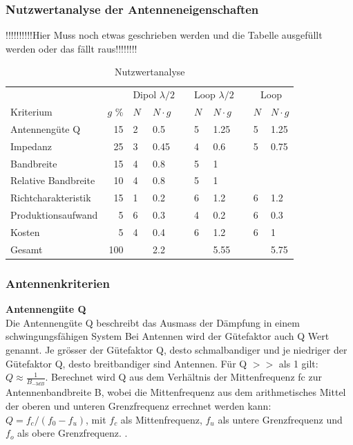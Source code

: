 \subsubsection{Nutzwertanalyse der Antenneneigenschaften }
!!!!!!!!!!Hier Muss noch etwas geschrieben werden und die Tabelle ausgefüllt werden oder das fällt raus!!!!!!!!
\begin{table}[!ht]
 \centering
 \begin{tabular}{l r l l l l l l l l} \toprule 
 && \multicolumn{2}{c}{Dipol $\lambda/2$} && \multicolumn{2}{c}{Loop $\lambda/2$} && \multicolumn{2}{c}{Loop} \\ \cmidrule{3-4} \cmidrule{6-7} \cmidrule{9-10}
 	Kriterium 	& $g$ \% 		& $N$ & $N\cdot g$ 	&& $N$ & $N\cdot g$ 		&& $N$ 	& $N\cdot g$ \\ \midrule
 	Antennengüte Q 	& 15 	& 2 & 0.5 	&& 5 & 1.25 && 5 	& 1.25 \\
 	Impedanz 	& 25 	& 3 & 0.45 	&& 4 & 0.6 && 5 	& 0.75 \\
	Bandbreite 				&	15			& 4 	& 0.8 	&& 5 & 1 							&&		&	\\
	Relative Bandbreite 		&	10			& 4 	& 0.8 	&& 5 & 1 							&&		&	\\
 	Richtcharakteristik & 15 & 1 & 0.2 	&& 6 & 1.2 && 6 	& 1.2 \\
 	Produktionsaufwand 	& 5 & 6 & 0.3 	&& 4 & 0.2 && 6 	& 0.3 \\
 	Kosten & 5 	& 4 & 0.4 	&& 6 & 1.2 && 6 	& 1 \\
 \hline
 Gesamt & 100 	& & 2.2 	&& & 5.55 && 	& 5.75 \\ \bottomrule
 \end{tabular}
 \caption{Nutzwertanalyse }
 \label{nutzwertEvaluation}
\end{table}


\subsubsection{Antennenkriterien}
\textbf{Antennengüte Q}\\
Die Antennengüte Q beschreibt das Ausmass der Dämpfung in einem schwingungsfähigen System Bei Antennen wird der Gütefaktor auch Q Wert genannt. Je grösser der Gütefaktor Q, desto schmalbandiger und je niedriger der Gütefaktor Q, desto breitbandiger sind Antennen. Für Q  $>>$ als 1 gilt: $Q \approx\frac{1}{B_{-3dB}}$. Berechnet wird Q aus dem Verhältnis der Mittenfrequenz fc zur Antennenbandbreite B, wobei die Mittenfrequenz aus dem arithmetisches Mittel der oberen und unteren Grenzfrequenz errechnet werden kann: $Q = f_c/(f_0-f_u)$, mit $f_c$ als Mittenfrequenz, $f_u$ als untere Grenzfrequenz und $f_o$ als obere Grenzfrequenz. \cite{Guetefaktor_Q}.\\

